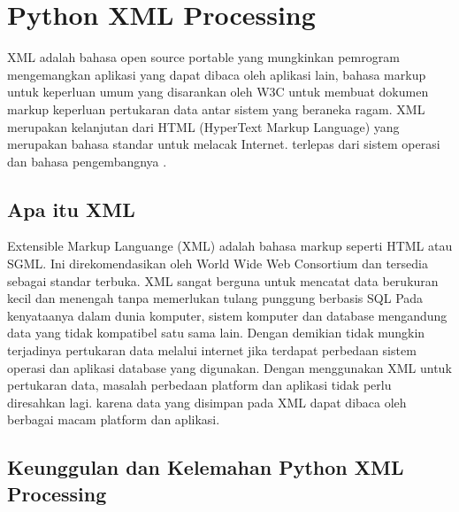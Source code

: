 

\section{Python XML Processing}
  XML adalah bahasa open source portable yang mungkinkan pemrogram mengemangkan aplikasi yang dapat dibaca oleh aplikasi lain, bahasa markup untuk keperluan umum yang disarankan oleh W3C untuk membuat dokumen markup keperluan pertukaran data antar sistem yang beraneka ragam. XML merupakan kelanjutan dari HTML (HyperText Markup Language) yang merupakan bahasa standar untuk melacak Internet.
terlepas dari sistem operasi dan bahasa pengembangnya .
\subsection{Apa itu XML}
  Extensible Markup Languange (XML) adalah bahasa markup seperti HTML atau SGML. 
Ini direkomendasikan oleh World Wide Web Consortium dan tersedia sebagai standar terbuka.
XML sangat berguna untuk mencatat data berukuran kecil dan menengah tanpa memerlukan tulang punggung berbasis SQL  
Pada kenyataanya dalam dunia komputer, sistem komputer dan database mengandung data yang tidak kompatibel satu sama lain. Dengan demikian tidak mungkin terjadinya pertukaran data melalui internet jika terdapat perbedaan sistem operasi dan aplikasi database yang digunakan.
Dengan menggunakan XML untuk pertukaran data, masalah perbedaan platform dan aplikasi tidak perlu diresahkan lagi. karena data yang disimpan pada XML dapat dibaca oleh berbagai macam platform dan aplikasi.

\subsection{Keunggulan dan Kelemahan Python XML Processing}

